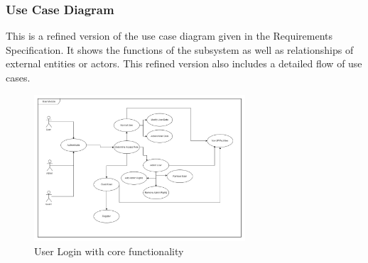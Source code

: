 \subsubsection{Use Case Diagram}
This is a refined version of the use case diagram given in the Requirements Specification. It shows the functions of the subsystem as well as relationships of external entities or actors. This refined version also includes a detailed flow of use cases.
\begin{figure}[H]
		\centering
		\includegraphics[width=0.7\textwidth]{user/img/UserUseCase.jpg}
		\caption{User Login with core functionality }
\end{figure}



